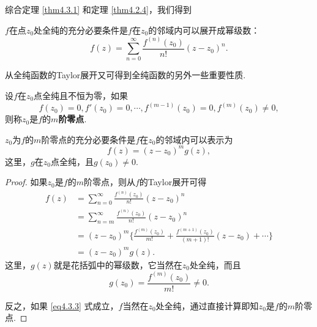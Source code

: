 综合定理 \ref{thm4.3.1} 和定理 \ref{thm4.2.4}，我们得到
\begin{theorem}\label{thm4.3.2}
  $f$在点$z_0$处全纯的充分必要条件是$f$在$z_0$的邻域内可以展开成幂级数：
  \begin{equation*}
    f(z) = \sum_{n=0}^\infty \frac{f^{(n)}(z_0)}{n!}(z-z_0)^n.
  \end{equation*}
\end{theorem}

从全纯函数的Taylor展开又可得到全纯函数的另外一些重要性质.

\begin{definition}\label{def4.3.3}
  设$f$在$z_0$点全纯且不恒为零，如果
  \[
    f(z_0) = 0,f'(z_0) = 0,\cdots,f^{(m-1)}(z_0) = 0,f^{(m)}(z_0)\ne0,
  \]
  则称$z_0$是$f$的\textbf{$m$阶零点}.
\end{definition}
\begin{prop}\label{prop4.3.4}
  $z_0$为$f$的$m$阶零点的充分必要条件是$f$在$z_0$的邻域内可以表示为
  \begin{equation}\label{eq4.3.3}
    f(z) = (z-z_0)^mg(z),
  \end{equation}
  这里，$g$在$z_0$点全纯，且$g(z_0)\ne0$.
\end{prop}
\begin{proof}
  如果$z_0$是$f$的$m$阶零点，则从$f$的Taylor展开可得
  \begin{align*}
    f(z) & = \sum_{n=0}^\infty \frac{f^{(n)}(z_0)}{n!}(z-z_0)^n\\
    & = \sum_{n=m}^\infty \frac{f^{(n)}(z_0)}{n!}(z-z_0)^n\\
    & = (z-z_0)^m\bigg\{\frac{f^{(m)}(z_0)}{m!} + \frac{f^{(m+1)}(z_0)}{(m+1)!}
      (z-z_0) + \cdots\bigg\}\\
    & = (z-z_0)^mg(z).
  \end{align*}
  这里，$g(z)$就是花括弧中的幂级数，它当然在$z_0$处全纯，而且
  \[
    g(z_0) = \frac{f^{(m)}(z_0)}{m!}\ne0.
  \]

  反之，如果 \eqref{eq4.3.3} 式成立，$f$当然在$z_0$处全纯，通过直接计算即知$z_0$是$f$的$m$阶零点.
\end{proof}

